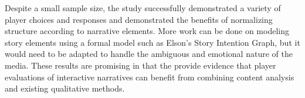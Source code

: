 Despite a small sample size, the study successfully demonstrated a
variety of player choices and responses and demonstrated the benefits
of normalizing structure according to narrative elements. More work
can be done on modeling story elements using a formal model such as
Elson's Story Intention Graph, but it would need to be adapted to
handle the ambiguous and emotional nature of the media. These results
are promising in that the provide evidence that player evaluations of
interactive narratives can benefit from combining content analysis and
existing qualitative methods.
